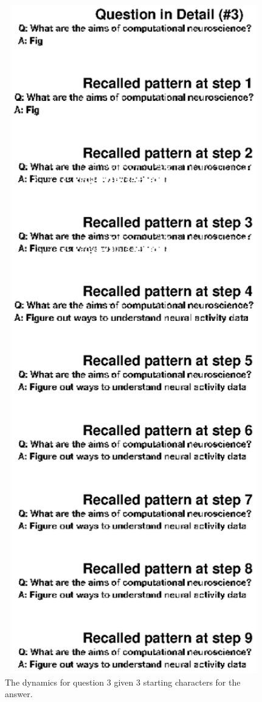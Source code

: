 \documentclass[11pt, oneside]{article}
\begin{document}
  \begin{figure}[H]
  \includegraphics[width=1\textwidth]{q3answer.eps}
  \caption{The dynamics for question 3 given 3 starting characters for the answer.}
  \label{fig:q3answer}
  \end{figure}
\end{document}
